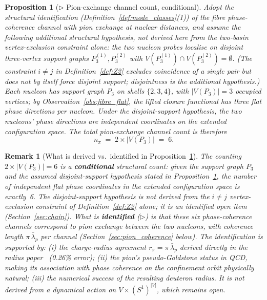 \documentclass[12pt]{article}
\newtheorem{proposition}[theorem]{Proposition}
\newtheorem{remark}[theorem]{Remark}
\newcommand{\lbar}{\bar{\lambda}}
\begin{document}
\begin{proposition}[$\triangleright$ Pion-exchange channel count, conditional]\label{prop:pion}
Adopt the structural identification (Definition~\ref{def:mode_classes}(1))
of the fibre phase-coherence channel with pion exchange at nuclear
distances, and assume the following additional structural hypothesis, \emph{not derived here} from the two-basin vertex-exclusion constraint alone: the two nucleon probes localise on \emph{disjoint} three-vertex support graphs $P_3^{(1)}, P_3^{(2)}$ with $V(P_3^{(1)}) \cap V(P_3^{(2)}) = \emptyset$. (The constraint $i \neq j$ in Definition~\ref{def:Z2} excludes coincidence of a single pair but does not by itself force disjoint support; disjointness is the additional hypothesis.) Each nucleon has support graph $P_3$ on shells
$\{2,3,4\}$, with $|V(P_3)| = 3$ occupied vertices; by
Observation~\ref{obs:fibre_flat}, the lifted closure functional has
three flat phase directions per nucleon. Under the disjoint-support hypothesis, the two nucleons' phase directions are independent coordinates on the extended configuration space.
The total pion-exchange channel count is therefore
\begin{equation}\label{eq:pion_count}
    n_\pi \;=\; 2 \times |V(P_3)| \;=\; 6.
\end{equation}
\end{proposition}

\begin{remark}[What is derived vs.\ identified in Proposition~\ref{prop:pion}]
The counting $2 \times |V(P_3)| = 6$ is a \textbf{conditional} structural
count: given the support graph $P_3$ and the \emph{assumed} disjoint-support hypothesis stated in Proposition~\ref{prop:pion}, the number of
independent flat phase coordinates in the extended configuration
space is exactly~6. The disjoint-support hypothesis is not derived from the $i \neq j$ vertex-exclusion constraint of Definition~\ref{def:Z2} alone; it is an identified open item (Section~\ref{sec:chain}). What is \textbf{identified} ($\triangleright$)
is that these six phase-coherence channels correspond to pion
exchange between the two nucleons, with coherence length $\pi\,\lbar_p$
per channel (Section~\ref{sec:pion_coherence} below). The
identification is supported by: (i) the charge-radius agreement
$r_\pi = \pi\,\lbar_p$ derived directly in the radius
paper~\citep{SmartRadius} (0.26\% error); (ii) the pion's
pseudo-Goldstone status in QCD, making its association with phase
coherence on the confinement orbit physically natural; (iii) the
numerical success of the resulting deuteron radius. It is not
derived from a dynamical action on $V \times (S^1)^{|V|}$, which
remains open.
\end{remark}
\end{document}
